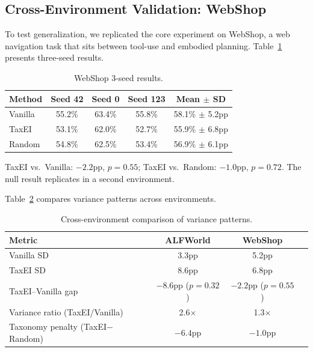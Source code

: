 \documentclass[11pt,a4paper]{article}
\begin{document}
\subsection{Cross-Environment Validation: WebShop}\label{sec:webshop}

To test generalization, we replicated the core experiment on WebShop, a web navigation task that sits between tool-use and embodied planning.
Table~\ref{tab:webshop} presents three-seed results.

\begin{table}[h]
\centering
\caption{WebShop 3-seed results.}
\label{tab:webshop}
\begin{tabular}{lcccc}
\toprule
\textbf{Method} & \textbf{Seed 42} & \textbf{Seed 0} & \textbf{Seed 123} & \textbf{Mean $\pm$ SD} \\
\midrule
Vanilla & 55.2\% & 63.4\% & 55.8\% & 58.1\% $\pm$ 5.2pp \\
TaxEI   & 53.1\% & 62.0\% & 52.7\% & 55.9\% $\pm$ 6.8pp \\
Random  & 54.8\% & 62.5\% & 53.4\% & 56.9\% $\pm$ 6.1pp \\
\bottomrule
\end{tabular}
\end{table}

TaxEI vs.\ Vanilla: $-2.2$pp, $p{=}0.55$; TaxEI vs.\ Random: $-1.0$pp, $p{=}0.72$.
The null result replicates in a second environment.

Table~\ref{tab:crossenv} compares variance patterns across environments.

\begin{table}[h]
\centering
\caption{Cross-environment comparison of variance patterns.}
\label{tab:crossenv}
\begin{tabular}{lccc}
\toprule
\textbf{Metric} & \textbf{ALFWorld} & \textbf{WebShop} \\
\midrule
Vanilla SD & 3.3pp & 5.2pp \\
TaxEI SD & 8.6pp & 6.8pp \\
TaxEI--Vanilla gap & $-8.6$pp ($p{=}0.32$) & $-2.2$pp ($p{=}0.55$) \\
Variance ratio (TaxEI/Vanilla) & 2.6$\times$ & 1.3$\times$ \\
Taxonomy penalty (TaxEI$-$Random) & $-6.4$pp & $-1.0$pp \\
\bottomrule
\end{tabular}
\end{table}
\end{document}
